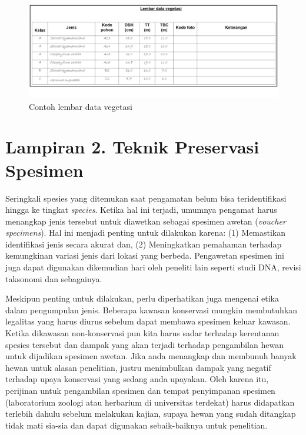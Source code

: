 \documentclass[
]{book}
\begin{document}
\begin{figure}

{\centering \includegraphics[width=1\linewidth]{images/ldv_m} 

}

\caption{Contoh lembar data vegetasi}\label{fig:ldvm}
\end{figure}

\hypertarget{lampiran-2.-teknik-preservasi-spesimen}{%
\chapter*{Lampiran 2. Teknik Preservasi Spesimen}\label{lampiran-2.-teknik-preservasi-spesimen}}

Seringkali spesies yang ditemukan saat pengamatan belum bisa teridentifikasi hingga ke tingkat \emph{species}. Ketika hal ini terjadi, umumnya pengamat harus menangkap jenis tersebut untuk diawetkan sebagai spesimen awetan (\emph{voucher specimens}). Hal ini menjadi penting untuk dilakukan karena: (1) Memastikan identifikasi jenis secara akurat dan, (2) Meningkatkan pemahaman terhadap kemungkinan variasi jenis dari lokasi yang berbeda. Pengawetan spesimen ini juga dapat digunakan dikemudian hari oleh peneliti lain seperti studi DNA, revisi taksonomi dan sebagainya.

Meskipun penting untuk dilakukan, perlu diperhatikan juga mengenai etika dalam pengumpulan jenis. Beberapa kawasan konservasi mungkin membutuhkan legalitas yang harus diurus sebelum dapat membawa spesimen keluar kawasan. Ketika dikawasan non-konservasi pun kita harus sadar terhadap kerentanan spesies tersebut dan dampak yang akan terjadi terhadap pengambilan hewan untuk dijadikan spesimen awetan. Jika anda menangkap dan membunuh banyak hewan untuk alasan penelitian, justru menimbulkan dampak yang negatif terhadap upaya konservasi yang sedang anda upayakan. Oleh karena itu, perijinan untuk pengambilan spesimen dan tempat penyimpanan spesimen (laboratorium zoologi atau herbarium di universitas terdekat) harus didapatkan terlebih dahulu sebelum melakukan kajian, supaya hewan yang sudah ditangkap tidak mati sia-sia dan dapat digunakan sebaik-baiknya untuk penelitian.
\end{document}
